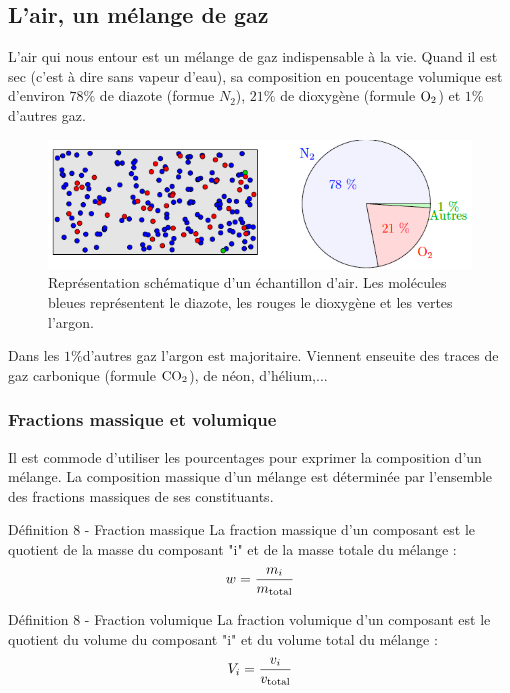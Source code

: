 \documentclass[french, a4paper, 12pt, twocolumn, landscape]{article}
\begin{document}
		
		



		\subsection{L'air, un mélange de gaz}


		L'air qui nous entour est un mélange de gaz indispensable à la vie. Quand il est sec (c'est à dire sans vapeur d'eau), sa composition en poucentage volumique est d'environ $78\%$ de diazote (formue $N_2$), $21\%$ de dioxygène (formule $\rm O_2$) et $1\%$ d'autres gaz.

		\begin{figure}[ht]
			\centering
			\includegraphics[width=.4\textwidth]{air.png}
			\caption{Représentation schématique d’un échantillon d’air. Les molécules bleues représentent le diazote, les rouges le dioxygène et les vertes l’argon.}
		\end{figure}
Dans les \og{}$1\%$d'autres gaz\fg{}  l'argon est majoritaire. Viennent enseuite des traces de gaz carbonique (formule $\rm CO_2$), de néon, d'hélium,...


		\subsubsection{Fractions massique et volumique}

		Il est commode d'utiliser les pourcentages pour exprimer la composition d'un mélange. La composition massique d'un mélange est déterminée par l'ensemble des fractions massiques de ses constituants. 

		\begin{definition}{Définition 8 - Fraction massique}
			La fraction massique d'un composant est le quotient de la masse du composant "i" et de la masse totale du mélange : 
			\begin{equation}
				w = \dfrac{m_i}{m_{\rm total}}
			\end{equation}
		\end{definition}

		
		\begin{definition}{Définition 8 - Fraction volumique}
			La fraction volumique d'un composant est le quotient du volume du composant "i" et du volume total du mélange : 
			\begin{equation}
				 V_i = \dfrac{v_i}{v_{\rm total}}
			\end{equation}
		\end{definition}
\end{document}
